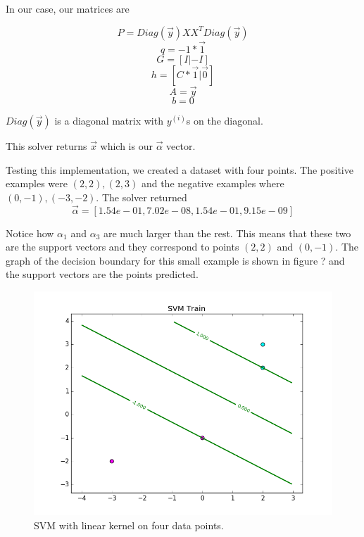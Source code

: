 \documentclass[10pt,twoside]{article}
\begin{document}
In our case, our matrices are 

\begin{equation*}
P = Diag(\overrightarrow{y}) X X^T Diag(\overrightarrow{y})
\end{equation*}
\begin{equation*}
q = -1 * \overrightarrow{1}
\end{equation*}
\begin{equation*}
G = [I | -I]
\end{equation*}
\begin{equation*}
h = [C * \overrightarrow{1} | \overrightarrow{0}]
\end{equation*}
\begin{equation*}
A = \overrightarrow{y}
\end{equation*}
\begin{equation*}
b = 0
\end{equation*}

$Diag(\overrightarrow{y})$ is a diagonal matrix with $y^{(i)}$s on the diagonal.

This solver returns $\overrightarrow{x}$ which is our $\overrightarrow{\alpha}$ vector.

Testing this implementation, we created a dataset with four points. The positive examples were $(2, 2),(2, 3)$ and the negative examples where $(0, -1),(-3, -2)$. The solver returned
\begin{equation}
\overrightarrow{\alpha} = [1.54e-01, 7.02e-08, 1.54e-01, 9.15e-09]
\end{equation}

Notice how $\alpha_1$ and $\alpha_3$ are much larger than the rest. This means that these two are the support vectors and they correspond to points $(2,2)$ and $(0,-1)$. The graph of the decision boundary for this small example is shown in figure ? and the support vectors are the points predicted.

\begin{figure}[h]
    \centering
    \includegraphics[width=60 mm]{Figures/P2/dumb.png}
    \caption{SVM with linear kernel on four data points. }
\end{figure}
\end{document}
